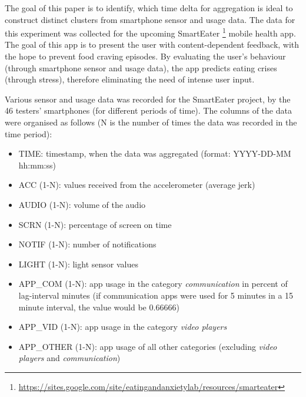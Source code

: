 

The goal of this paper is to identify, which time delta for aggregation is ideal to construct distinct clusters from smartphone sensor and usage data. The data for this experiment was collected for the upcoming SmartEater \footnote{\url{https://sites.google.com/site/eatingandanxietylab/resources/smarteater}} mobile health app. The goal of this app is to present the user with content-dependent feedback, with the hope to prevent food craving episodes. By evaluating the user's behaviour (through smartphone sensor and usage data), the app predicts eating crises (through stress), therefore eliminating the need of intense user input. 



Various sensor and usage data was recorded for the SmartEater project, by the 46 testers' smartphones (for different periods of time). The columns of the data were organised as follows (N is the number of times the data was recorded in the time period):
 

\begin{itemize}
	\item TIME: timestamp, when the data was aggregated (format: YYYY-DD-MM hh:mm:ss)
	\item ACC (1-N): values received from the accelerometer (average jerk)
	\item AUDIO (1-N): volume of the audio 
	\item SCRN (1-N): percentage of screen on time
	\item NOTIF (1-N): number of notifications
	\item LIGHT (1-N): light sensor values
	\item APP\_COM (1-N): app usage in the category \textit{communication} in percent of lag-interval minutes (if communication apps were used for 5 minutes in a 15 minute interval, the value would be 0.66666)
	\item APP\_VID (1-N): app usage in the category \textit{video players}
	\item APP\_OTHER (1-N): app usage of all other categories (excluding \textit{video players} and \textit{communication})
\end{itemize}


